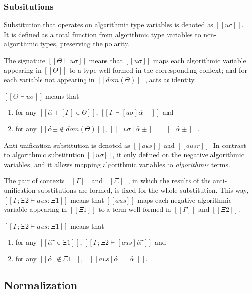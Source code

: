 \documentclass[a4,natbib=false]{article}
\begin{document}
\subsubsection{Subsitutions}

Substitution that operates on algorithmic type variables is denoted as
$[[uσ]]$. It is defined as a total function from algorithmic 
type variables to non-algorithmic types, preserving the polarity.

The signature $[[Θ ⊢ uσ]]$ means that $[[uσ]]$ maps each algorithmic 
variable appearing in $[[Θ]]$ to a type well-formed in the corresponding
context; and for each variable not appearing in $[[dom(Θ)]]$, acts as identity.

\begin{definition}
  $[[Θ ⊢ uσ]]$ means that
  \begin{enumerate}
    \item for any $[[ α̂±[Γ] ∊ Θ]]$, $[[ Γ ⊢ [uσ]α̂± ]]$ and
    \item for any $[[ α̂± ∉ dom(Θ)]]$, $[[ [uσ]α̂± ]] =  [[ α̂± ]]$.
  \end{enumerate}
\end{definition}

Anti-unification substitution is denoted as $[[aus]]$ and $[[ausr]]$.
In contrast to algorithmic substitution $[[uσ]]$,
it only defined on the negative algorithmic variables, 
and it allows mapping algorithmic variables to
\emph{algorithmic} terms.

The pair of contexts $[[Γ]]$ and $[[Ξ]]$,
in which the results of the anti-unification substitutions 
are formed, is fixed for the whole substitution.
This way, $[[Γ; Ξ2 ⊢ aus : Ξ1]]$ means that $[[aus]]$ maps each negative algorithmic
variable appearing in $[[Ξ1]]$ to a term well-formed in $[[Γ]]$ and $[[Ξ2]]$.

\begin{definition}
  $[[Γ; Ξ2 ⊢ aus : Ξ1]]$ means that
  \begin{enumerate}
    \item for any $[[ α̂⁻ ∊ Ξ1]]$, $[[ Γ; Ξ2 ⊢ [aus]α̂⁻ ]]$ and
    \item for any $[[ α̂⁻ ∉ Ξ1]]$, $[[ [aus]α̂⁻ = α̂⁻ ]]$.
  \end{enumerate}
\end{definition}



\subsection{Normalization}
\end{document}
